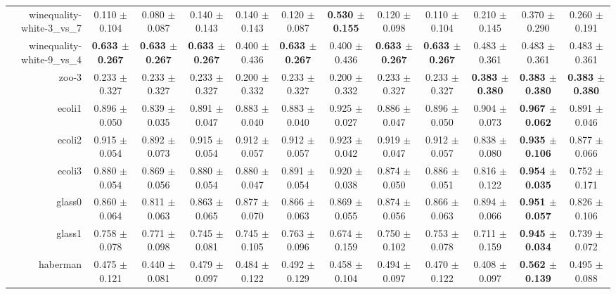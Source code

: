 \begin{table}[!ht]
{\begin{tabular}{r c c c c c c c c c c c}
winequality-white-3\_vs\_7 & 0.110 $\pm$ 0.104 & 0.080 $\pm$ 0.087 & 0.140 $\pm$ 0.143 & 0.140 $\pm$ 0.143 & 0.120 $\pm$ 0.087 & \textbf{0.530 $\pm$ 0.155} & 0.120 $\pm$ 0.098 & 0.110 $\pm$ 0.104 & 0.210 $\pm$ 0.145 & 0.370 $\pm$ 0.290 & 0.260 $\pm$ 0.191 \\
winequality-white-9\_vs\_4 & \textbf{0.633 $\pm$ 0.267} & \textbf{0.633 $\pm$ 0.267} & \textbf{0.633 $\pm$ 0.267} & 0.400 $\pm$ 0.436 & \textbf{0.633 $\pm$ 0.267} & 0.400 $\pm$ 0.436 & \textbf{0.633 $\pm$ 0.267} & \textbf{0.633 $\pm$ 0.267} & 0.483 $\pm$ 0.361 & 0.483 $\pm$ 0.361 & 0.483 $\pm$ 0.361 \\
zoo-3 & 0.233 $\pm$ 0.327 & 0.233 $\pm$ 0.327 & 0.233 $\pm$ 0.327 & 0.200 $\pm$ 0.332 & 0.233 $\pm$ 0.327 & 0.200 $\pm$ 0.332 & 0.233 $\pm$ 0.327 & 0.233 $\pm$ 0.327 & \textbf{0.383 $\pm$ 0.380} & \textbf{0.383 $\pm$ 0.380} & \textbf{0.383 $\pm$ 0.380} \\
ecoli1 & 0.896 $\pm$ 0.050 & 0.839 $\pm$ 0.035 & 0.891 $\pm$ 0.047 & 0.883 $\pm$ 0.040 & 0.883 $\pm$ 0.040 & 0.925 $\pm$ 0.027 & 0.886 $\pm$ 0.047 & 0.896 $\pm$ 0.050 & 0.904 $\pm$ 0.073 & \textbf{0.967 $\pm$ 0.062} & 0.891 $\pm$ 0.046 \\
ecoli2 & 0.915 $\pm$ 0.054 & 0.892 $\pm$ 0.073 & 0.915 $\pm$ 0.054 & 0.912 $\pm$ 0.057 & 0.912 $\pm$ 0.057 & 0.923 $\pm$ 0.042 & 0.919 $\pm$ 0.047 & 0.912 $\pm$ 0.057 & 0.838 $\pm$ 0.080 & \textbf{0.935 $\pm$ 0.106} & 0.877 $\pm$ 0.066 \\
ecoli3 & 0.880 $\pm$ 0.054 & 0.869 $\pm$ 0.056 & 0.880 $\pm$ 0.054 & 0.880 $\pm$ 0.047 & 0.891 $\pm$ 0.054 & 0.920 $\pm$ 0.038 & 0.874 $\pm$ 0.050 & 0.886 $\pm$ 0.051 & 0.816 $\pm$ 0.122 & \textbf{0.954 $\pm$ 0.035} & 0.752 $\pm$ 0.171 \\
glass0 & 0.860 $\pm$ 0.064 & 0.811 $\pm$ 0.063 & 0.863 $\pm$ 0.065 & 0.877 $\pm$ 0.070 & 0.866 $\pm$ 0.063 & 0.869 $\pm$ 0.055 & 0.874 $\pm$ 0.056 & 0.866 $\pm$ 0.063 & 0.894 $\pm$ 0.066 & \textbf{0.951 $\pm$ 0.057} & 0.826 $\pm$ 0.106 \\
glass1 & 0.758 $\pm$ 0.078 & 0.771 $\pm$ 0.098 & 0.745 $\pm$ 0.081 & 0.745 $\pm$ 0.105 & 0.763 $\pm$ 0.096 & 0.674 $\pm$ 0.159 & 0.750 $\pm$ 0.102 & 0.753 $\pm$ 0.078 & 0.711 $\pm$ 0.159 & \textbf{0.945 $\pm$ 0.034} & 0.739 $\pm$ 0.072 \\
haberman & 0.475 $\pm$ 0.121 & 0.440 $\pm$ 0.081 & 0.479 $\pm$ 0.097 & 0.484 $\pm$ 0.122 & 0.492 $\pm$ 0.129 & 0.458 $\pm$ 0.104 & 0.494 $\pm$ 0.097 & 0.470 $\pm$ 0.122 & 0.408 $\pm$ 0.097 & \textbf{0.562 $\pm$ 0.139} & 0.495 $\pm$ 0.088 \\

\end{tabular}}
\end{table}
